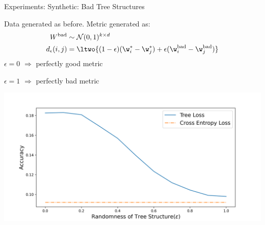 


\begin{frame}{Experiments: Synthetic: Bad Tree Structures}

Data generated as before.
Metric generated as:
\begin{align*}
    W^{\text{bad}}  &\sim \mathcal N(0,1)^{k\times d} \\
    d_\epsilon(i,j) &= \ltwo{(1-\epsilon)(\w_i^*-\w_j^*) + \epsilon(\w^{\text{bad}}_i - \w^{\text{bad}}_j)}
\end{align*}
$\epsilon=0$ $\Rightarrow$ perfectly good metric

$\epsilon=1$ $\Rightarrow$ perfectly bad metric

    \vspace{-0.1in}
\begin{center}
\includegraphics[width=0.8\columnwidth]{fig/new_img/loss_vs_structure.png}
\end{center}
\end{frame}
